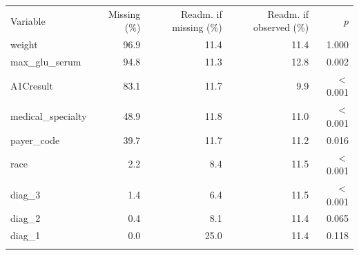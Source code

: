 \begin{tabular}{lrrrr}
\hline\noalign{\smallskip}
Variable & Missing (\%) & Readm. if missing (\%) & Readm. if observed (\%) & $p$ \\
\noalign{\smallskip}\hline\noalign{\smallskip}
weight & 96.9 & 11.4 & 11.4 & 1.000 \\
max\_glu\_serum & 94.8 & 11.3 & 12.8 & 0.002 \\
A1Cresult & 83.1 & 11.7 & 9.9 & $<$0.001 \\
medical\_specialty & 48.9 & 11.8 & 11.0 & $<$0.001 \\
payer\_code & 39.7 & 11.7 & 11.2 & 0.016 \\
race & 2.2 & 8.4 & 11.5 & $<$0.001 \\
diag\_3 & 1.4 & 6.4 & 11.5 & $<$0.001 \\
diag\_2 & 0.4 & 8.1 & 11.4 & 0.065 \\
diag\_1 & 0.0 & 25.0 & 11.4 & 0.118 \\
\noalign{\smallskip}\hline
\end{tabular}